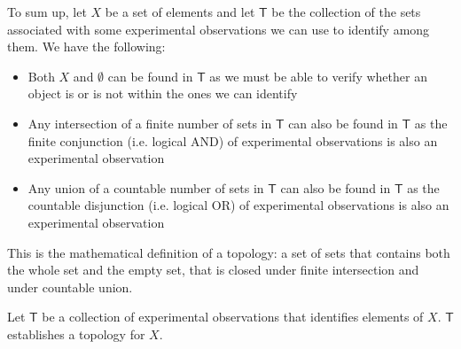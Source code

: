 \documentclass[11pt,letterpaper,fleqn]{memoir} %
\begin{document}
To sum up, let $X$ be a set of elements and let $\mathsf{T}$ be the collection of the sets associated with some experimental observations we can use to identify among them. We have the following:
\begin{itemize}
	\item Both $X$ and $\emptyset$ can be found in $\mathsf{T}$ as we must be able to verify whether an object is or is not within the ones we can identify
	\item Any intersection of a finite number of sets in $\mathsf{T}$ can also be found in $\mathsf{T}$ as the finite conjunction (i.e. logical AND) of experimental observations is also an experimental observation
	\item Any union of a countable number of sets in $\mathsf{T}$ can also be found in $\mathsf{T}$ as the countable disjunction (i.e. logical OR) of experimental observations is also an experimental observation
\end{itemize}
This is the mathematical definition of a topology: a set of sets that contains both the whole set and the empty set, that is closed under finite intersection and under countable union.

\begin{stmt}
	Let $\mathsf{T}$ be a collection of experimental observations that identifies elements of $X$. $\mathsf{T}$ establishes a topology for $X$.
\end{stmt}
\end{document}
